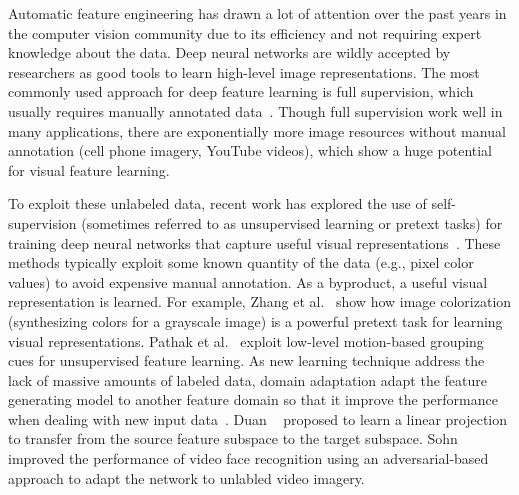 Automatic feature engineering has drawn a lot of attention over the
past years in the computer vision community due to its efficiency and
not requiring expert knowledge about the data. Deep neural networks
are wildly accepted by researchers as good tools to learn high-level
image representations.
The most commonly used approach for deep feature learning is
full supervision, which usually requires manually annotated
data~\cite{yosinski2014transferable,zhou2016learning,wen2016discriminative}.
Though full supervision work well in many applications, there are
exponentially more image resources without manual annotation (cell
phone imagery, YouTube videos\etc), which show a huge potential for
visual feature learning.   

To exploit these unlabeled data, recent work has explored the use of
self-supervision (sometimes referred to as unsupervised learning or
pretext tasks) for training deep neural networks that capture useful
visual representations~\cite{doersch2015unsupervised,pathak2016context}. 
These methods typically
exploit some known quantity of the data (e.g., pixel color values) to
avoid expensive manual annotation. As a byproduct, a useful visual
representation is learned.
For example, Zhang et al.~\cite{zhang2016colorful} show how image
colorization (synthesizing colors for a grayscale image) is a powerful
pretext task for learning visual representations. Pathak et
al.~\cite{pathak2017learning} exploit low-level motion-based grouping
cues for unsupervised feature learning.  
%
As new learning technique address the lack of massive amounts of
labeled data, domain adaptation adapt the feature generating model to
another feature domain so that it improve the performance when dealing
with new input
data~\cite{fernando2013unsupervised,fernando2015joint,saenko2010adapting,wang2016actions,tinghui2016flow}.
Duan \etal~\cite{duan2012learning} proposed to learn a linear
projection to transfer from the source feature subspace to the target
subspace. Sohn \etal~\cite{sohn2017unsupervised} improved the
performance of video face recognition using an adversarial-based
approach to adapt the network to unlabled video imagery.


